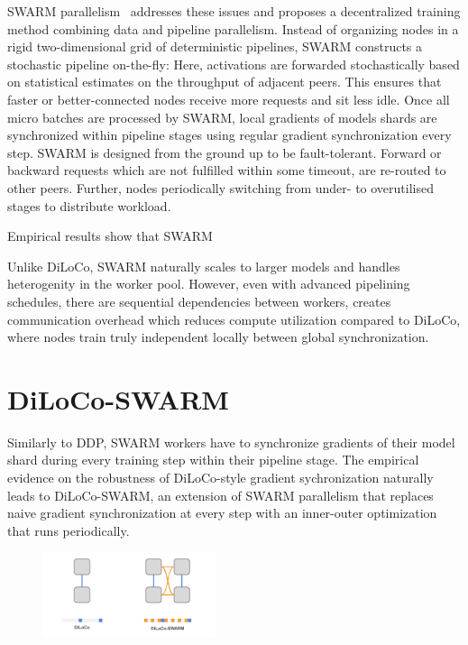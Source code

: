 \documentclass{article}
\begin{document}
SWARM parallelism~\cite{ryabinin2023} addresses these issues and proposes a
decentralized training method combining data and pipeline parallelism. Instead
of organizing nodes in a rigid two-dimensional grid of deterministic pipelines,
SWARM constructs a stochastic pipeline on-the-fly: Here, activations are
forwarded stochastically based on statistical estimates on the throughput of
adjacent peers. This ensures that faster or better-connected nodes receive more
requests and sit less idle. Once all micro batches are processed by SWARM, local
gradients of models shards are synchronized within pipeline stages using regular
gradient synchronization every step.  SWARM is designed from the ground up to be
fault-tolerant. Forward or backward requests which are not fulfilled within some
timeout, are re-routed to other peers. Further, nodes periodically switching
from under- to overutilised stages to distribute workload.


Empirical results show that SWARM 

Unlike DiLoCo, SWARM naturally scales to larger models and handles heterogenity
in the worker pool. However, even with advanced pipelining schedules, there are 
sequential dependencies between workers, creates communication overhead which 
reduces compute utilization compared to DiLoCo, where nodes train truly
independent locally between global synchronization.

\section{DiLoCo-SWARM}

Similarly to DDP, SWARM workers have to synchronize gradients of their model
shard during every training step within their pipeline stage. The empirical
evidence on the robustness of DiLoCo-style gradient sychronization naturally
leads to DiLoCo-SWARM, an extension of SWARM parallelism that replaces naive
gradient synchronization at every step with an inner-outer optimization that
runs periodically.

\begin{figure}[h]
    \centering
    \includegraphics[width=0.45\textwidth]{figures/diloco-swarm.png}
    \caption{}
    \label{fig:diloco-swarm}
\end{figure}
\end{document}
